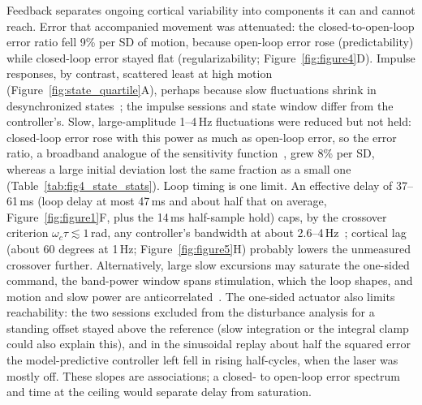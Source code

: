 Feedback separates ongoing cortical variability into components it can and cannot reach. Error that accompanied movement was attenuated: the closed-to-open-loop error ratio fell 9\% per SD of motion, because open-loop error rose (predictability) while closed-loop error stayed flat (regularizability; Figure~\ref{fig:figure4}D). Impulse responses, by contrast, scattered least at high motion (Figure~\ref{fig:state_quartile}A), perhaps because slow fluctuations shrink in desynchronized states~\citep{McGinley2015waking}; the impulse sessions and state window differ from the controller's. Slow, large-amplitude 1--4\,Hz fluctuations were reduced but not held: closed-loop error rose with this power as much as open-loop error, so the error ratio, a broadband analogue of the sensitivity function~\citep{astrom2008feedback}, grew 8\% per SD, whereas a large initial deviation lost the same fraction as a small one (Table~\ref{tab:fig4_state_stats}). Loop timing is one limit. An effective delay of 37--61\,ms (loop delay at most 47\,ms and about half that on average, Figure~\ref{fig:figure1}F, plus the 14\,ms half-sample hold) caps, by the crossover criterion $\omega_c\tau \lesssim 1$\,rad, any controller's bandwidth at about 2.6--4\,Hz~\citep{skogestad2005multivariable}; cortical lag (about 60 degrees at 1\,Hz; Figure~\ref{fig:figure5}H) probably lowers the unmeasured crossover further. Alternatively, large slow excursions may saturate the one-sided command, the band-power window spans stimulation, which the loop shapes, and motion and slow power are anticorrelated~\citep{McGinley2015waking}. The one-sided actuator also limits reachability: the two sessions excluded from the disturbance analysis for a standing offset stayed above the reference (slow integration or the integral clamp could also explain this), and in the sinusoidal replay about half the squared error the model-predictive controller left fell in rising half-cycles, when the laser was mostly off. These slopes are associations; a closed- to open-loop error spectrum and time at the ceiling would separate delay from saturation.


